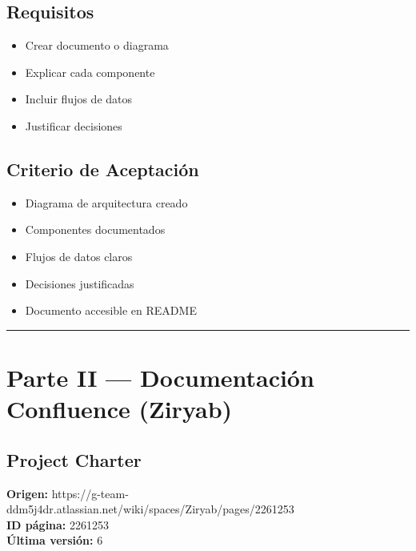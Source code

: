 \documentclass[
  spanish,
  11pt,
]{report}
\providecommand{\tightlist}{%
  \setlength{\itemsep}{0pt}\setlength{\parskip}{0pt}}
\begin{document}
\section{Requisitos}\label{requisitos-16}

\begin{itemize}
\tightlist
\item
  Crear documento o diagrama
\item
  Explicar cada componente
\item
  Incluir flujos de datos
\item
  Justificar decisiones
\end{itemize}

\section{Criterio de Aceptación}\label{criterio-de-aceptaciuxf3n-16}

\begin{itemize}
\tightlist
\item[$\boxtimes$]
  Diagrama de arquitectura creado
\item[$\boxtimes$]
  Componentes documentados
\item[$\boxtimes$]
  Flujos de datos claros
\item[$\boxtimes$]
  Decisiones justificadas
\item[$\square$]
  Documento accesible en README
\end{itemize}

\begin{center}\rule{0.5\linewidth}{0.5pt}\end{center}

\newpage

\chapter{Parte II --- Documentación Confluence
(Ziryab)}\label{parte-ii-documentaciuxf3n-confluence-ziryab}

\section{Project Charter}\label{project-charter}

\textbf{Origen:}
https://g-team-ddm5j4dr.atlassian.net/wiki/spaces/Ziryab/pages/2261253\\
\textbf{ID página:} 2261253\\
\textbf{Última versión:} 6
\end{document}
